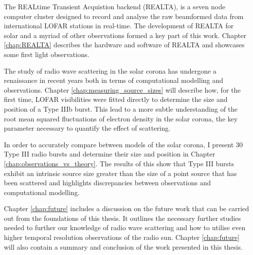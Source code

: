 The REALtime Transient Acquistion backend (REALTA), is a seven node computer cluster designed to record and analyse the raw beamformed data from international LOFAR stations in real-time. The development of REALTA for solar and a myriad of other observations formed a key part of this work. Chapter \ref{chap:REALTA} describes the hardware and software of REALTA and showcases some first light observations.
 
The study of radio wave scattering in the solar corona has undergone a renaissance in recent years both in terms of computational modelling and observations. Chapter \ref{chap:measuring_source_sizes} will describe how, for the first time, LOFAR visibilities were fitted directly to determine the size and position of a Type IIIb burst. This lead to a more subtle understanding of the root mean squared fluctuations of electron density in the solar corona, the key parameter necessary to quantify the effect of scattering. 

In order to accurately compare between models of the solar corona, I present 30 Type III radio bursts and determine their size and position in Chapter \ref{chap:observations_vs_theory}. The results of this show that Type III bursts exhibit an intrinsic source size greater than the size of a point source that has been scattered and highlights discrepancies between observations and computational modelling.

Chapter \ref{chap:future} includes a discussion on the future work that can be carried out from the foundations of this thesis. It outlines the necessary further studies needed to further our knowledge of radio wave scattering and how to utilise even higher temporal resolution observations of the radio sun. Chapter \ref{chap:future} will also contain a summary and conclusion of the work presented in this thesis.

